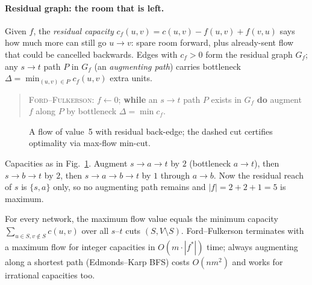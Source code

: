 \paragraph{Residual graph: the room that is left.} Given $f$, the \emph{residual capacity} $c_f(u,v)=c(u,v)-f(u,v)+f(v,u)$ says how much more can still go $u\to v$: spare room forward, plus already-sent flow that could be cancelled backwards. Edges with $c_f>0$ form the residual graph $G_f$; any $s\to t$ path $P$ in $G_f$ (an \emph{augmenting path}) carries bottleneck $\Delta=\min_{(u,v)\in P}c_f(u,v)$ extra units.
\begin{quote}\ttfamily\scriptsize
\textsc{Ford--Fulkerson}: $f\gets0$; \textbf{while} an $s\to t$ path $P$ exists in $G_f$ \textbf{do} augment $f$ along $P$ by bottleneck $\Delta=\min c_f$.
\end{quote}
\begin{figure}[h]\centering{}\caption{A flow of value~5 with residual back-edge; the dashed cut certifies optimality via max-flow min-cut.}\label{fig:maxflow}\end{figure}
\begin{example} Capacities as in Fig.~\ref{fig:maxflow}. Augment $s\to a\to t$ by $2$ (bottleneck $a\to t$), then $s\to b\to t$ by $2$, then $s\to a\to b\to t$ by $1$ through $a\to b$. Now the residual reach of $s$ is $\{s,a\}$ only, so no augmenting path remains and $|f|=2+2+1=5$ is maximum.
\end{example}
\begin{theorem} For every network, the maximum flow value equals the minimum capacity $\sum_{u\in S,v\notin S}c(u,v)$ over all $s$--$t$ cuts $(S,V\setminus S)$. Ford--Fulkerson terminates with a maximum flow for integer capacities in $O(m\cdot|f^*|)$ time; always augmenting along a shortest path (Edmonds--Karp BFS) costs $O(nm^2)$ and works for irrational capacities too.
\end{theorem}

